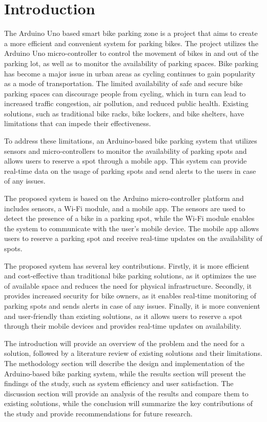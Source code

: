 \documentclass[conference]{IEEEtran}
\begin{document}
	\section{Introduction}

	The Arduino Uno based smart bike parking zone is a project that aims to create a more efficient and convenient system for parking bikes. The project utilizes the Arduino Uno micro-controller to control the movement of bikes in and out of the parking lot, as well as to monitor the availability of parking spaces. 
	Bike parking has become a major issue in urban areas as cycling continues to gain popularity as a mode of transportation. The limited availability of safe and secure bike parking spaces can discourage people from cycling, which in turn can lead to increased traffic congestion, air pollution, and reduced public health. Existing solutions, such as traditional bike racks, bike lockers, and bike shelters, have limitations that can impede their effectiveness.\cite{b8}
	
	To address these limitations, an Arduino-based bike parking system that utilizes sensors and micro-controllers to monitor the availability of parking spots and allows users to reserve a spot through a mobile app. This system can provide real-time data on the usage of parking spots and send alerts to the users in case of any issues. 
	
	The proposed system is based on the Arduino micro-controller platform and includes sensors, a Wi-Fi module, and a mobile app. The sensors are used to detect the presence of a bike in a parking spot, while the Wi-Fi module enables the system to communicate with the user's mobile device. The mobile app allows users to reserve a parking spot and receive real-time updates on the availability of spots.
	
	
	The proposed system has several key contributions. Firstly, it is more efficient and cost-effective than traditional bike parking solutions, as it optimizes the use of available space and reduces the need for physical infrastructure. Secondly, it provides increased security for bike owners, as it enables real-time monitoring of parking spots and sends alerts in case of any issues. Finally, it is more convenient and user-friendly than existing solutions, as it allows users to reserve a spot through their mobile devices and provides real-time updates on availability.
	
	 The introduction will provide an overview of the problem and the need for a solution, followed by a literature review of existing solutions and their limitations. The methodology section will describe the design and implementation of the Arduino-based bike parking system, while the results section will present the findings of the study, such as system efficiency and user satisfaction. The discussion section will provide an analysis of the results and compare them to existing solutions, while the conclusion will summarize the key contributions of the study and provide recommendations for future research.\cite{b9}
\end{document}
